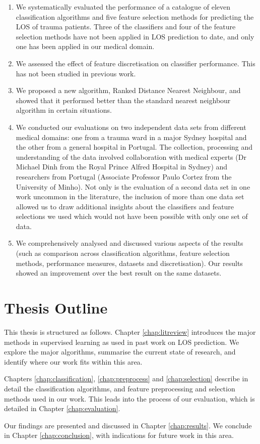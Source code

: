 \begin{enumerate}
\item We systematically evaluated the performance of a catalogue of eleven
classification algorithms and five feature selection methods for predicting the
LOS of trauma patients. Three of the classifiers and four of the feature
selection methods have not been applied in LOS prediction to date, and only
one has been applied in our medical domain. 

\item We assessed the effect of feature discretisation on classifier
performance. This has not been studied in previous work.

\item We proposed a new algorithm, Ranked Distance Nearest Neighbour, and
showed that it performed better than the standard nearest neighbour algorithm
in certain situations.

\item We conducted our evaluations on two independent data sets from different
medical domains: one from a trauma ward in a major Sydney hospital and the other
from a general hospital in Portugal. The collection, processing and
understanding of the data involved collaboration with medical experts (Dr
Michael Dinh from the Royal Prince Alfred Hospital in Sydney) and researchers
from Portugal (Associate Professor Paulo Cortez from the University of Minho).
Not only is the evaluation of a second data set in one work uncommon in the
literature, the inclusion of more than one data set allowed us to draw
additional insights about the classifiers and feature selections we used
which would not have been possible with only one set of data. 

\item We comprehensively analysed and discussed various aspects of the results
(such as comparison across classification algorithms, feature selection
methods, performance measures, datasets and discretisation). Our results showed
an improvement over the best result on the same datasets.
\end{enumerate}

\section{Thesis Outline}
This thesis is structured as follows. Chapter \ref{chap:litreview} introduces
the major methods in supervised learning as used in past work on LOS
prediction. We explore the major algorithms, summarise the current state of
research, and identify where our work fits within this area.

Chapters \ref{chap:classification}, \ref{chap:preprocess} and
\ref{chap:selection} describe in detail the classification algorithms, and
feature preprocessing and selection methods used in our work. This leads into
the process of our evaluation, which is detailed in Chapter
\ref{chap:evaluation}.

Our findings are presented and discussed in Chapter \ref{chap:results}.
We conclude in Chapter \ref{chap:conclusion}, with indications for future
work in this area.
